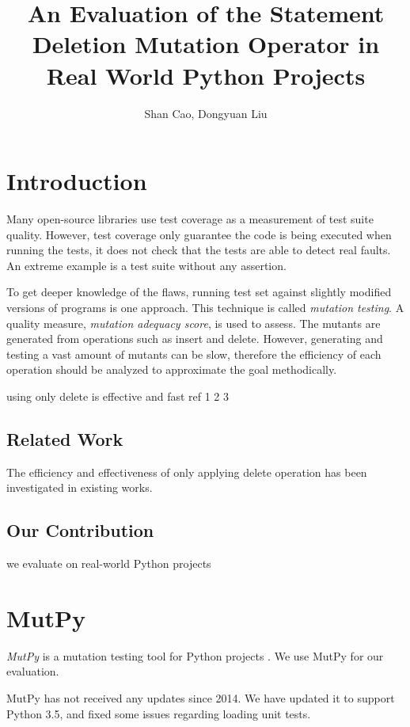 \documentclass[12pt]{article}
\title{\textbf{An Evaluation of the Statement Deletion Mutation Operator in Real World Python Projects}}
\author{Shan Cao, Dongyuan Liu}
\begin{document}
\maketitle
\tableofcontents

\section{Introduction}

Many open-source libraries use test coverage as a measurement of test suite quality. However, test coverage only guarantee the code is being executed when running the tests, it does not check that the tests are able to detect real faults. An extreme example is a test suite without any assertion.

To get deeper knowledge of the flaws, running test set against slightly modified versions of programs is one approach\cite{}. This technique is called \emph{mutation testing}. A quality measure, \emph{mutation adequacy score}, is used to assess. The mutants are generated from operations such as insert and delete. However, generating and testing a vast amount of mutants can be slow, therefore the efficiency of each operation should be analyzed to approximate the goal methodically.

using only delete is effective and fast ref 1 2 3

\subsection{Related Work}

The efficiency and effectiveness of only applying delete operation has been investigated in existing works.

\subsection{Our Contribution}

we evaluate on real-world Python projects

\section{MutPy}

\emph{MutPy} is a mutation testing tool for Python projects \cite{mutpy}. We use MutPy for our evaluation.

MutPy has not received any updates since 2014. We have updated it to support Python 3.5, and fixed some issues regarding loading unit tests.
\end{document}
